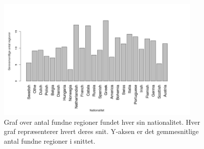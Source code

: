 \begin{figure}[!h]
	\begin{center}
		\includegraphics[angle=0,width=0.90\textwidth]{afsnit/resultater/billeder/nationcut.png}
	\end{center}
	\caption{Graf over antal fundne regioner fundet hver sin
       nationalitet. Hver graf repræsenterer hvert deres snit. Y-aksen
       er det gemmesnitlige antal fundne regioner i snittet.}
	\label{udvidet_nation}
\end{figure}


